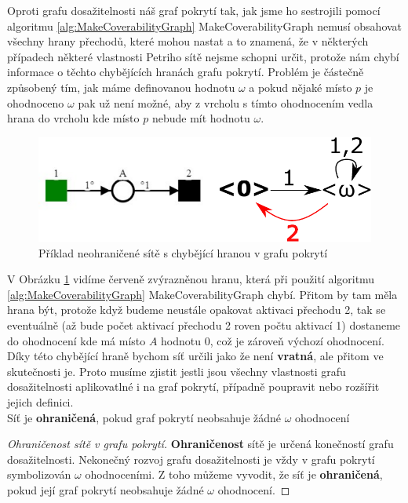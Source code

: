 \documentclass[
  biblatex,
  glossaries,
]{kidiplom}
\begin{document}
Oproti grafu dosažitelnosti náš graf pokrytí tak, jak jsme ho sestrojili 
pomocí algoritmu \ref{alg:MakeCoverabilityGraph} MakeCoverabilityGraph 
nemusí obsahovat všechny hrany přechodů, které mohou nastat a to znamená, 
že v některých případech některé vlastnosti Petriho sítě nejsme schopni určit, 
protože nám chybí informace o těchto chybějících hranách grafu pokrytí.
Problém je částečně způsobený tím, jak máme definovanou hodnotu $\omega$ a pokud 
nějaké místo $p$ je ohodnoceno $\omega$ pak už není možné, aby z vrcholu s tímto 
ohodnocením vedla hrana do vrcholu kde místo $p$ nebude mít hodnotu $\omega$.

\clearpage
\begin{figure}[h]
  \centering
  \includegraphics[width=0.8\linewidth]{net_undecidable_reversion}
  \caption{Příklad neohraničené sítě s chybějící hranou v grafu pokrytí}\label{fig:neohraničená síť reversible}
\end{figure}
V Obrázku \ref{fig:neohraničená síť reversible} vidíme červeně zvýrazněnou 
hranu, která při použití algoritmu \ref{alg:MakeCoverabilityGraph} MakeCoverabilityGraph
chybí. Přitom by tam měla hrana být, protože když budeme neustále opakovat 
aktivaci přechodu 2, tak se eventuálně (až bude počet aktivací přechodu 2 roven počtu aktivací 1) 
dostaneme do ohodnocení kde má místo $A$
hodnotu 0, což je zároveň výchozí ohodnocení. Díky této chybějící hraně 
bychom síť určili jako že není \textbf{vratná}, ale přitom ve skutečnosti je.
Proto musíme zjistit jestli jsou všechny vlastnosti grafu dosažitelnosti 
aplikovatlné i na graf pokrytí, případně poupravit nebo rozšířit jejich definici.
\\

Síť je \textbf{ohraničená}, pokud graf pokrytí neobsahuje žádné $\omega$ ohodnocení
\begin{proof}[Ohraničenost sítě v grafu pokrytí]
  \textbf{Ohraničenost} sítě je určená konečností grafu dosažitelnosti.
  Nekonečný rozvoj grafu dosažitelnosti je vždy v grafu pokrytí symbolizován
  $\omega$ ohodnoceními. Z toho můžeme vyvodit, že síť je 
  \textbf{ohraničená}, pokud její graf pokrytí neobsahuje žádné $\omega$ ohodnocení.
\end{proof}
\end{document}
